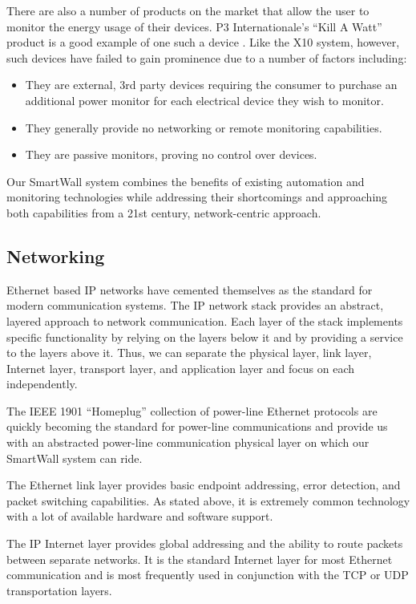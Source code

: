 \documentclass[12pt]{article}
\begin{document}
There are also a number of products on the market that allow the user
to monitor the energy usage of their devices. P3 Internationale's
``Kill A Watt'' product is a good example of one such a device
\cite{p3-KillAWatt}. Like the X10 system, however, such devices have
failed to gain prominence due to a number of factors including:
\begin{itemize}
  \setlength{\itemsep}{0pt}
  \setlength{\parskip}{0pt}
  \setlength{\parsep}{0pt}
\item They are external, 3rd party devices requiring the consumer to
  purchase an additional power monitor for each electrical device they
  wish to monitor. 
\item They generally provide no networking or remote monitoring capabilities.
\item They are passive monitors, proving no control over devices.
\end{itemize}  

Our SmartWall system combines the benefits of existing automation and
monitoring technologies while addressing their shortcomings and
approaching both capabilities from a 21st century, network-centric approach.

\subsection{Networking}
Ethernet based IP networks have cemented themselves as the standard
for modern communication systems. The IP network stack provides an
abstract, layered approach to network communication. Each layer of the
stack implements specific functionality by relying on the layers below
it and by providing a service to the layers above it. Thus, we can
separate the physical layer, link layer, Internet layer, transport
layer, and application layer and focus on each independently.

The IEEE 1901 ``Homeplug'' collection of power-line Ethernet protocols are
quickly becoming the standard for power-line communications and provide
us with an abstracted power-line communication physical layer on which our
SmartWall system can ride.

The Ethernet link layer provides basic endpoint addressing, error
detection, and packet switching capabilities. As stated above, it is
extremely common technology with a lot of available hardware and
software support.

The IP Internet layer provides global addressing and the ability to
route packets between separate networks. It is the standard Internet layer
for most Ethernet communication and is most frequently used in
conjunction with the TCP or UDP transportation layers.
\end{document}
